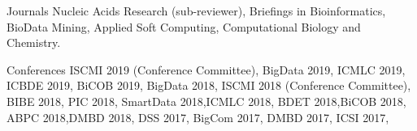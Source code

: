 
\begin{cvskills}
\cvskill
{Journals} %
{Nucleic Acids Research (sub-reviewer), Briefings in Bioinformatics, BioData Mining, Applied Soft Computing, Computational Biology and Chemistry.} %

\cvskill
{Conferences} %
{ISCMI 2019 (Conference Committee), BigData 2019, ICMLC 2019, ICBDE 2019, BiCOB 2019, BigData 2018, ISCMI 2018 (Conference Committee), BIBE 2018, PIC 2018, SmartData 2018,ICMLC 2018, BDET 2018,BiCOB 2018, ABPC 2018,DMBD 2018, DSS 2017, BigCom 2017, DMBD 2017, ICSI 2017,  
} %


\end{cvskills}
